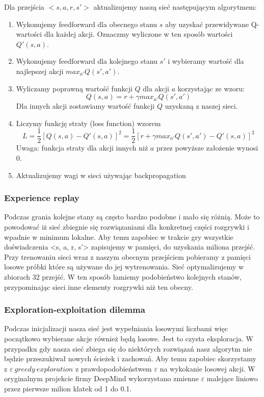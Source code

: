 \documentclass[12pt]{article}
\begin{document}
Dla przejścia $<s, a, r, s'>$ aktualizujemy naszą sieć następującym algorytmem:
\begin{enumerate}
\item Wykonujemy feedforward dla obecnego stanu $s$ aby uzyskać przewidywane Q-wartości dla każdej akcji. Oznaczmy wyliczone w ten sposób wartości $Q'(s,a)$.
\item Wykonujemy feedforward dla kolejnego stanu $s'$ i wybieramy wartość dla najlepszej akcji $max_{a'}Q(s',a')$.
\item Wyliczamy poprawną wartość funkcji $Q$ dla akcji $a$ korzystając ze wzoru: $$Q(s, a) = r + \gamma max_{a'}Q(s',a')$$ Dla innych akcji zostawiamy wartość funkcji $Q$ uzyskaną z naszej sieci.
\item Liczymy funkcję straty (loss function) wzorem $$L=\frac{1}{2}[Q(s,a)-Q'(s,a)]^2=\frac{1}{2}[r+\gamma max_{a'}Q(s',a')-Q'(s,a)]^2$$ Uwaga: funkcja straty dla akcji innych niż $a$ przez powyższe założenie wynosi 0. 
\item Aktualizujemy wagi w sieci używając backpropagation
\end{enumerate}

\subsubsection{Experience replay}

Podczas grania kolejne stany są często bardzo podobne i mało się różnią. Może to powodować iż sieć zbiegnie się rozwiązaniami dla konkretnej części rozgrywki i wpadnie w minimum lokalne. Aby temu zapobiec w trakcie gry wszystkie doświadczenia <s, a, r, s'> zapisujemy w pamięci, do uzyskania miliona przejść.  Przy trenowaniu sieci wraz z naszym obecnym przejściem pobieramy z pamięci losowe próbki które są używane do jej wytrenowania. Sieć optymalizujemy w zbiorach 32 przejść. W ten sposób łamiemy podobieństwo kolejnych stanów, przypominając sieci inne elementy rozgrywki niż ten obecny. 

\subsubsection{Exploration-exploitation dilemma}

Podczas inicjalizacji nasza sieć jest wypełniania losowymi liczbami więc początkowo wybierane akcje również będą losowe. Jest to czysta eksploracja. W przypadku gdy nasza sieć zbiega się do niektórych rozwiązań nasz algorytm nie będzie przeszukiwał nowych ścieżek i zachowań. Aby temu zapobiec skorzystamy z $\varepsilon\ greedy\ exploration$ z prawdopodobieństwem $\varepsilon$ na wykokanie losowej akcji. W oryginalnym projekcie firmy DeepMind wykorzystano zmienne $\varepsilon$ malejące liniowo przez pierwsze milion klatek od 1 do 0.1.
\end{document}

